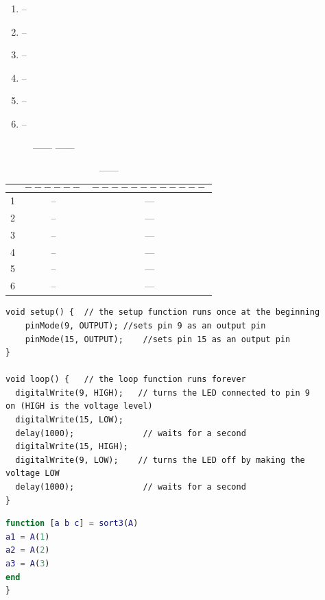\begin{enumerate}
\item --
\item --
\item --
\item --
\item --
\item --
\end{enumerate}

\begin{figure}[H]
\centering
\caption{\label{fig:------} ------ ------  }
\end{figure}
								
	
\begin{table}[H]
  \centering
 
    \begin{tabular}{c|c|c}
       &$$------$$ & $$------------$$ \\ \hline
       1 & -- & ---  \\ \hline
       2 & -- & ---  \\ \hline
       3 & -- & ---  \\ \hline
       4 & -- & ---  \\ \hline
       5 & -- & ---  \\ \hline
       6 & -- & --- 
      
  \end{tabular}
  \caption{------}
  \label{tab:------}
\end{table}
	
	
\begin{lstlisting}[style=CStyle]
void setup() {	// the setup function runs once at the beginning
    pinMode(9, OUTPUT);	//sets pin 9 as an output pin
    pinMode(15, OUTPUT);	//sets pin 15 as an output pin
}

void loop() {	// the loop function runs forever 
  digitalWrite(9, HIGH);   // turns the LED connected to pin 9  													on (HIGH is the voltage level)
  digitalWrite(15, LOW);
  delay(1000);              // waits for a second
  digitalWrite(15, HIGH);  
  digitalWrite(9, LOW);    // turns the LED off by making the 														voltage LOW
  delay(1000);              // waits for a second
}

\end{lstlisting}

\vfill

\begin{lstlisting}[language=Matlab]
function [a b c] = sort3(A) 
a1 = A(1) 
a2 = A(2) 
a3 = A(3) 
end
}
\end{lstlisting}

